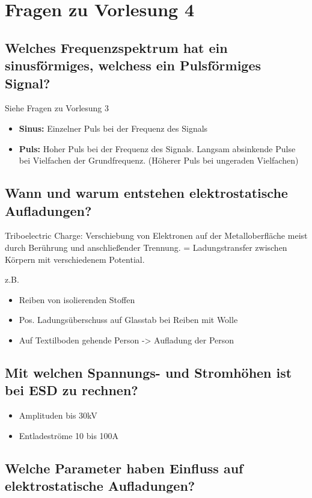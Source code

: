 \section{Fragen zu Vorlesung 4}

\subsection{Welches Frequenzspektrum hat ein sinusförmiges, welchess ein Pulsförmiges Signal?}
Siehe Fragen zu Vorlesung 3
\begin{itemize}
  \item \textbf{Sinus:} Einzelner Puls bei der Frequenz des Signals
  \item \textbf{Puls:} Hoher Puls bei der Frequenz des Signals. Langsam absinkende Pulse bei Vielfachen der Grundfrequenz. (Höherer Puls bei ungeraden Vielfachen)
\end{itemize}

\subsection{Wann und warum entstehen elektrostatische Aufladungen?}
Triboelectric Charge: Verschiebung von Elektronen auf der Metalloberfläche meist durch Berührung und anschließender Trennung.
= Ladungstransfer zwischen Körpern mit verschiedenem Potential.

z.B.
\begin{itemize}
  \item Reiben von isolierenden Stoffen
  \item Pos. Ladungsüberschuss auf Glasstab bei Reiben mit Wolle
  \item Auf Textilboden gehende Person -> Aufladung der Person
\end{itemize}

\subsection{Mit welchen Spannungs- und Stromhöhen ist bei ESD zu rechnen?}
\begin{itemize}
  \item Amplituden bis 30kV
  \item Entladeströme 10 bis 100A
\end{itemize}

\subsection{Welche Parameter haben Einfluss auf elektrostatische Aufladungen?}


